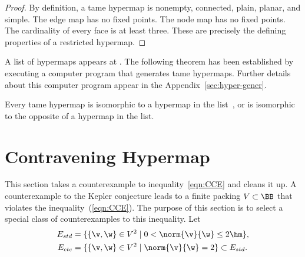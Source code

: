\begin{proof}
  By definition, a tame hypermap is nonempty, connected, plain,
  planar, and simple.  The edge map has no fixed points.  The node map
  has no fixed points.  The cardinality of every face is at least
  three.  These are precisely the defining properties of a restricted
  hypermap.
\end{proof}


A list of hypermaps appears at \cite{website:Hales:1998:Code}.  The following
theorem has been established by executing a computer program that generates
tame hypermaps.  Further details about this computer program appear in
the Appendix~\ref{sec:hyper-gener}.

%

\begin{theorem}
  \label{theorem:classification} Every tame hypermap is isomorphic to
  a hypermap in the list~\cite{website:Hales:1998:Code}, or is
  isomorphic to the opposite of a hypermap in the list.
\end{theorem}



%
%

\section{Contravening Hypermap}

This section takes a counterexample to inequality~\ref{eqn:CCE} and cleans it up.
%
A counterexample to the Kepler conjecture leads to a finite packing
$V\subset \BB$ that violates the inequality~(\ref{eqn:CCE}).  The
purpose of this section is to select a special class of
counterexamples to this inequality.  Let
\begin{align}\label{eqn:fan-edge}
E_{std} &= \{\{\v,\w\}\in V^2\mid 0 < \norm{\v}{\w}\le 2\hm \},\\
E_{ctc} &= \{ \{\v,\w\}\in V^2\mid \norm{\v}{\w}= 2 \}\subset E_{std}.
\end{align}

